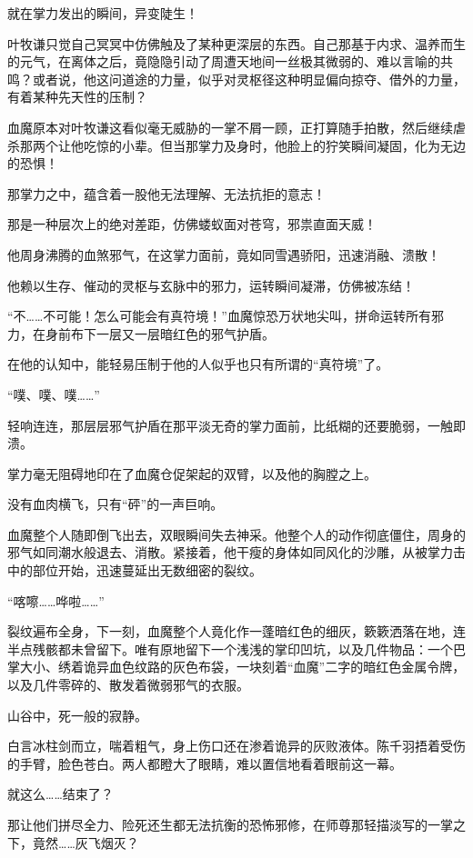 就在掌力发出的瞬间，异变陡生！

叶牧谦只觉自己冥冥中仿佛触及了某种更深层的东西。自己那基于内求、温养而生的元气，在离体之后，竟隐隐引动了周遭天地间一丝极其微弱的、难以言喻的共鸣？或者说，他这问道途的力量，似乎对灵枢径这种明显偏向掠夺、借外的力量，有着某种先天性的压制？

血魔原本对叶牧谦这看似毫无威胁的一掌不屑一顾，正打算随手拍散，然后继续虐杀那两个让他吃惊的小辈。但当那掌力及身时，他脸上的狞笑瞬间凝固，化为无边的恐惧！

那掌力之中，蕴含着一股他无法理解、无法抗拒的意志！

那是一种层次上的绝对差距，仿佛蝼蚁面对苍穹，邪祟直面天威！

他周身沸腾的血煞邪气，在这掌力面前，竟如同雪遇骄阳，迅速消融、溃散！

他赖以生存、催动的灵枢与玄脉中的邪力，运转瞬间凝滞，仿佛被冻结！

“不……不可能！怎么可能会有真符境！”血魔惊恐万状地尖叫，拼命运转所有邪力，在身前布下一层又一层暗红色的邪气护盾。

在他的认知中，能轻易压制于他的人似乎也只有所谓的“真符境”了。

“噗、噗、噗……”

轻响连连，那层层邪气护盾在那平淡无奇的掌力面前，比纸糊的还要脆弱，一触即溃。

掌力毫无阻碍地印在了血魔仓促架起的双臂，以及他的胸膛之上。

没有血肉横飞，只有“砰”的一声巨响。

血魔整个人随即倒飞出去，双眼瞬间失去神采。他整个人的动作彻底僵住，周身的邪气如同潮水般退去、消散。紧接着，他干瘦的身体如同风化的沙雕，从被掌力击中的部位开始，迅速蔓延出无数细密的裂纹。

“喀嚓……哗啦……”

裂纹遍布全身，下一刻，血魔整个人竟化作一蓬暗红色的细灰，簌簌洒落在地，连半点残骸都未曾留下。唯有原地留下一个浅浅的掌印凹坑，以及几件物品：一个巴掌大小、绣着诡异血色纹路的灰色布袋，一块刻着“血魔”二字的暗红色金属令牌，以及几件零碎的、散发着微弱邪气的衣服。

\vspace{2em}

山谷中，死一般的寂静。

白言冰柱剑而立，喘着粗气，身上伤口还在渗着诡异的灰败液体。陈千羽捂着受伤的手臂，脸色苍白。两人都瞪大了眼睛，难以置信地看着眼前这一幕。

就这么……结束了？

那让他们拼尽全力、险死还生都无法抗衡的恐怖邪修，在师尊那轻描淡写的一掌之下，竟然……灰飞烟灭？

